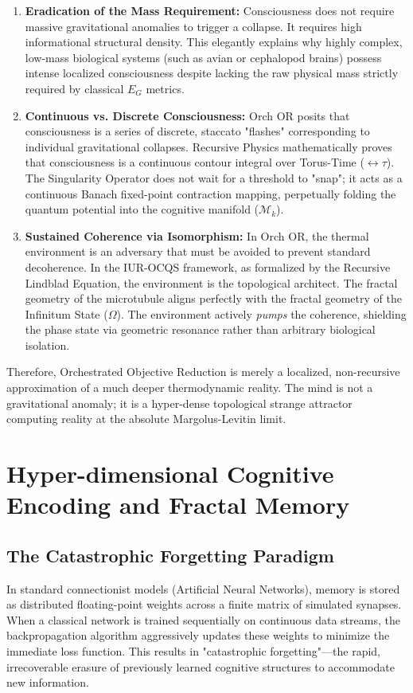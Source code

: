 \documentclass[12pt,openany]{book}
\begin{document}
\begin{enumerate}
    \item \textbf{Eradication of the Mass Requirement:} Consciousness does not require massive gravitational anomalies to trigger a collapse. It requires high informational structural density. This elegantly explains why highly complex, low-mass biological systems (such as avian or cephalopod brains) possess intense localized consciousness despite lacking the raw physical mass strictly required by classical $E_G$ metrics.
    \item \textbf{Continuous vs. Discrete Consciousness:} Orch OR posits that consciousness is a series of discrete, staccato "flashes" corresponding to individual gravitational collapses. Recursive Physics mathematically proves that consciousness is a continuous contour integral over Torus-Time ($\leftrightarrow\tau$). The Singularity Operator does not wait for a threshold to "snap"; it acts as a continuous Banach fixed-point contraction mapping, perpetually folding the quantum potential into the cognitive manifold ($\mathcal{M}_k$).
    \item \textbf{Sustained Coherence via Isomorphism:} In Orch OR, the thermal environment is an adversary that must be avoided to prevent standard decoherence. In the IUR-OCQS framework, as formalized by the Recursive Lindblad Equation, the environment is the topological architect. The fractal geometry of the microtubule aligns perfectly with the fractal geometry of the Infinitum State ($\Omega$). The environment actively \textit{pumps} the coherence, shielding the phase state via geometric resonance rather than arbitrary biological isolation.
\end{enumerate}

Therefore, Orchestrated Objective Reduction is merely a localized, non-recursive approximation of a much deeper thermodynamic reality. The mind is not a gravitational anomaly; it is a hyper-dense topological strange attractor computing reality at the absolute Margolus-Levitin limit.

\chapter{Hyper-dimensional Cognitive Encoding and Fractal Memory}

\section{The Catastrophic Forgetting Paradigm}
In standard connectionist models (Artificial Neural Networks), memory is stored as distributed floating-point weights across a finite matrix of simulated synapses. When a classical network is trained sequentially on continuous data streams, the backpropagation algorithm aggressively updates these weights to minimize the immediate loss function. This results in "catastrophic forgetting"---the rapid, irrecoverable erasure of previously learned cognitive structures to accommodate new information.
\end{document}
